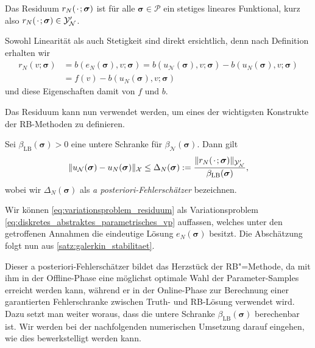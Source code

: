 \documentclass[../main.tex]{subfiles}
\begin{document}
\begin{Lemma}\label{lemma:rbm_residuum_ist_funktional}
    Das Residuum $r_{N}({\mkern2mu\cdot\mkern2mu}; \bm \sigma)$ ist für alle $\bm \sigma \in \mathcal P$ ein stetiges lineares Funktional, kurz also $r_{N}({\mkern2mu\cdot\mkern2mu}; \bm \sigma) \in \mathcal Y_{\mathcal N}'$.

    \begin{Beweis}
        Sowohl Linearität als auch Stetigkeit sind direkt ersichtlich, denn nach Definition erhalten wir
        \begin{equation}
            \begin{aligned}
            r_{N}(v; \bm \sigma)
            &= b(e_{N}(\bm \sigma), v; \bm \sigma)
            = b(u_{\mathcal N}(\bm \sigma), v; \bm \sigma) - b(u_{N}(\bm \sigma), v; \bm \sigma)
            \\&= f(v) - b(u_{N}(\bm \sigma), v; \bm \sigma)
            \end{aligned}
        \end{equation}
        und diese Eigenschaften damit von $f$ und $b$.
    \end{Beweis}
\end{Lemma}

Das Residuum kann nun verwendet werden, um eines der wichtigsten Konstrukte der RB-Methoden zu definieren.

\begin{Lemma}\label{lemma:rbm_fehler_schranke}
    Sei $\beta_{\mathrm{LB}}(\bm \sigma) > 0$ eine untere Schranke für $\beta_{\mathcal N}(\bm \sigma)$.
    Dann gilt
    \begin{equation}
        \lVert u_{\mathcal N}(\bm \sigma) - u_{N}(\bm \sigma)\rVert_{\mathcal X} \leq \Delta_{N}(\bm \sigma) := \frac{\lVert r_{N}({\mkern2mu\cdot\mkern2mu}; \bm \sigma)\rVert_{\mathcal Y_{\mathcal N}'}}{\beta_{\mathrm{LB}}(\bm \sigma)},
    \end{equation}
    wobei wir $\Delta_{N}(\bm \sigma)$ als \emph{a posteriori-Fehlerschätzer} bezeichnen.

    \begin{Beweis}
        Wir können \cref{eq:variationsproblem_residuum} als Variationsproblem \cref{eq:diskretes_abstraktes_parametrisches_vp} auffassen, welches unter den getroffenen Annahmen die eindeutige Lösung $e_{N}(\bm \sigma)$ besitzt.
        Die Abschätzung folgt nun aus \cref{satz:galerkin_stabilitaet}.
    \end{Beweis}
\end{Lemma}

Dieser a posteriori-Fehlerschätzer bildet das Herzstück der RB"=Methode, da mit ihm in der Offline-Phase eine möglichst optimale Wahl der Parameter-Samples erreicht werden kann, während er in der Online-Phase zur Berechnung einer garantierten Fehlerschranke zwischen Truth- und RB-Lösung verwendet wird.
Dazu setzt man weiter woraus, dass die untere Schranke $\beta_{\mathrm{LB}}(\bm \sigma)$ berechenbar ist.
Wir werden bei der nachfolgenden numerischen Umsetzung darauf eingehen, wie dies bewerkstelligt werden kann.
\end{document}
